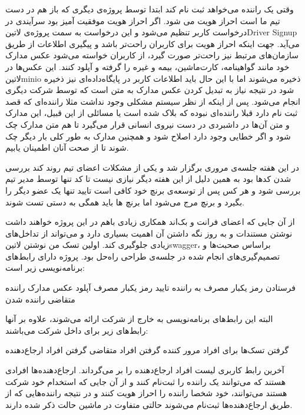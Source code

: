\documentclass[a4]{report}
\begin{document}
وقتی یک راننده می‌خواهد ثبت نام کند ابتدا توسط پروژه‌ی دیگری که باز هم در دست تیم ما است احراز هویت می شود.
اگر احراز هویت موفقیت آمیز بود سرآیندی در درخواست کاربر تنظیم می‌شود و این درخواست به سمت پروژه‌ی ‌لاتین{Driver Signup} می‌آید.
جهت اینکه احراز هویت برای کاربران راحت‌تر باشد و پیگیری اطلاعات از طریق سازمان‌های مرتبط نیز راحت‌تر صورت گیرد، از کاربران خواسته می‌شود عکس مدارک خود مانند گواهینامه، کارت‌ماشین، بیمه و غیره را گرفته و آپلود کنند.
این عکس‌ها در ‌لاتین{minio} ذخیره می‌شوند اما با این حال باید اطلاعات کاربر در پایگاه‌داده‌ای نیز ذخیره شود در نتیجه نیاز به تبدیل کردن عکس مدارک به متن است که توسط شرکت دیگری انجام می‌شود.
پس از اینکه از نظر سیستم مشکلی وجود نداشت مثلا راننده‌ای که قصد ثبت نام دارد قبلا راننده‌ای نبوده که بلاک شده است یا مسائلی از این قبیل،
این مدارک و متن آن‌ها در داشبردی در دست نیروی انسانی قرار می‌گیرد تا هم متن مدارک چک شود و اگر خطایی وجود دارد اصلاح شود و همچنین مدارک به طور کلی بار دیگر چک شوند تا از صحت آنان اطمینان یابیم.

در این هفته جلسه‌ی مروری برگزار شد و یکی از مشکلات اعضای تیم روند کند بررسی شدن کدها بود به همین دلیل از این هفته دیگر نیازی نیست تا کد تنها توسط مدیر تیم بررسی شود
و هر کس پس از توسعه‌ی برنچ خود کافی است تایید تنها یک عضو دیگر را بگیرد و برنچ مرج می‌شود اما برنچ ها باید همگی به دستی تست شوند.

از آن جایی که اعضای فرانت و بک‌اند همکاری زیادی باهم در این پروژه خواهند داشت نوشتن مستندات و به روز نگه داشتن آن اهمیت بسیاری دارد
و می‌تواند از تداخل‌های زیادی جلوگیری کند. اولین تسک من نوشتن ‌لاتین{swagger}، براساس صحبت‌ها و تصمیم‌گیری‌های انجام شده در جلسه‌ی طراحی راه‌حل بود.
پروژه دارای رابط‌های برنامه‌نویسی زیر است:

 فرستادن رمز یکبار مصرف به راننده
 تایید رمز یکبار مصرف
 آپلود عکس مدارک راننده
 متقاضی راننده شدن

البته این رابط‌های برنامه‌نویسی به خارج از شرکت ارائه می‌شوند، علاوه بر آنها رابط‌های زیر برای داخل شرکت می‌باشند:

 گرفتن تسک‌ها برای افراد مرور کننده
 گرفتن افراد متقاضی
 گرفتن افراد ارجاع‌دهنده

آخرین رابط کاربری لیست افراد ارجاع‌دهنده را بر می‌گرداند. ارجاع‌دهنده‌ها افرادی هستند که می‌توانند یک راننده را ثبت‌نام کنند و از آن جایی که استخدام خود شرکت هستند
می‌توانند، خود شخصا راننده را احراز هویت کنند و در نتیجه راننده‌هایی که از طریق ارجاع‌دهنده‌ها ثبت‌نام می‌شوند حالتی متفاوت در ماشین حالت ذکر شده دارند.
\end{document}
